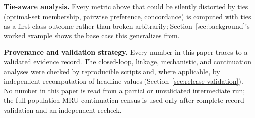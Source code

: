\textbf{Tie-aware analysis.} Every metric above that could be silently
distorted by ties (optimal-set membership, pairwise preference,
concordance) is computed with ties as a first-class outcome rather than
broken arbitrarily; Section~\ref{sec:background}'s worked example shows
the base case this generalizes from.

\textbf{Provenance and validation strategy.} Every number in this paper
traces to a validated evidence record. The closed-loop, linkage,
mechanistic, and continuation analyses were checked by reproducible scripts
and, where applicable, by independent recomputation of headline values
(Section~\ref{sec:release-validation}). No number in this paper is read
from a partial or unvalidated intermediate run; the full-population MRU
continuation census is used only after complete-record validation and an
independent recheck.
